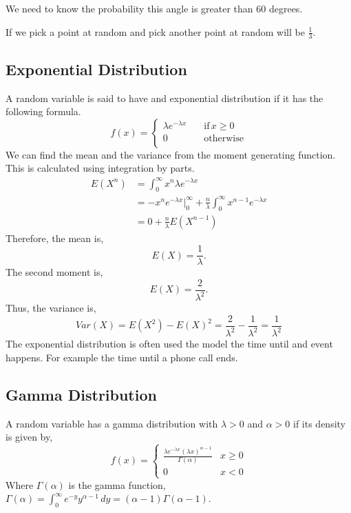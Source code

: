 \documentclass{article}
\begin{document}
We need to know the probability this angle is greater than $60$ degrees.

If we pick a point at random and pick another point at random will be $\frac{1}{3}$.

\subsection{Exponential Distribution}

A random variable is said to have and exponential distribution if it has the following formula.
$$
    f(x) = 
    \begin{cases}
        \lambda e ^ {-\lambda x} \quad & \text{if} \, x \geq 0 \\
        0 \quad & \text{otherwise} \\
    \end{cases}
$$
We can find the mean and the variance from the moment generating function. This is calculated using integration by parts.
\begin{align}
    E(X^n) & = \int_{0}^{\infty} x^n \lambda e^{-\lambda x} \\
           & = - x^n e^{-\lambda x} \Bigr|^\infty_0 + \frac{n}{\lambda}\int_{0}^{\infty} x^{n - 1} e^{-\lambda x} \\
           & = 0 + \frac{n}{\lambda} E(X^{n - 1})
\end{align}
Therefore, the mean is,
\begin{equation}
    E(X) = \frac{1}{\lambda}.
\end{equation}
The second moment is,
\begin{equation}
    E(X) = \frac{2}{\lambda^2}.
\end{equation}
Thus, the variance is,
\begin{equation}
    Var(X) = E(X^2) - E(X)^2 = \frac{2}{\lambda^2} - \frac{1}{\lambda^2} = \frac{1}{\lambda^2}
\end{equation}
The exponential distribution is often used the model the time until and event happens. For example the time until a phone call ends.

\subsection{Gamma Distribution}

A random variable has a gamma distribution with $\lambda > 0$ and $\alpha > 0$ if its density is given by,
\begin{equation}
    f(x) =
    \begin{cases}
        \frac{\lambda e^{-\lambda x} (\lambda x)^{\alpha - 1}}{\Gamma(\alpha)} & x \geq 0 \\
        0 & x < 0
    \end{cases}
\end{equation}
Where $\Gamma(\alpha)$ is the gamma function, $\Gamma(\alpha) = \int_0^\infty e^{-y} y^{\alpha - 1} \, dy = (\alpha - 1)\Gamma(\alpha - 1)$.


\end{document}
